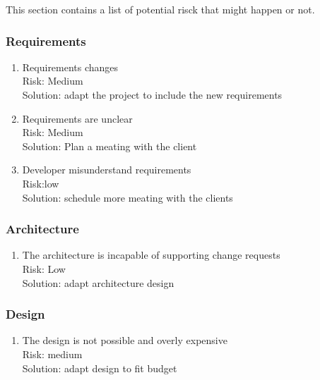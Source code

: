 This section contains a list of potential risck that might happen or not.\\


\subsubsection{Requirements}
\begin{enumerate}
\item Requirements changes\\
Risk: Medium\\
Solution: adapt the project to include the new requirements\\
\item Requirements are unclear\\
Risk: Medium\\
Solution: Plan a meating with the client\\
\item Developer misunderstand requirements \\
Risk:low\\
Solution: schedule more meating with the clients\\
\end{enumerate}

\subsubsection{Architecture} 
\begin{enumerate}
\item The architecture is incapable of supporting change requests\\
Risk: Low\\
Solution: adapt architecture design\\
\end{enumerate}

\subsubsection{Design}
\begin{enumerate}
\item The design is not possible and overly expensive\\
Risk: medium\\
Solution: adapt design to fit budget\\
\end{enumerate}

